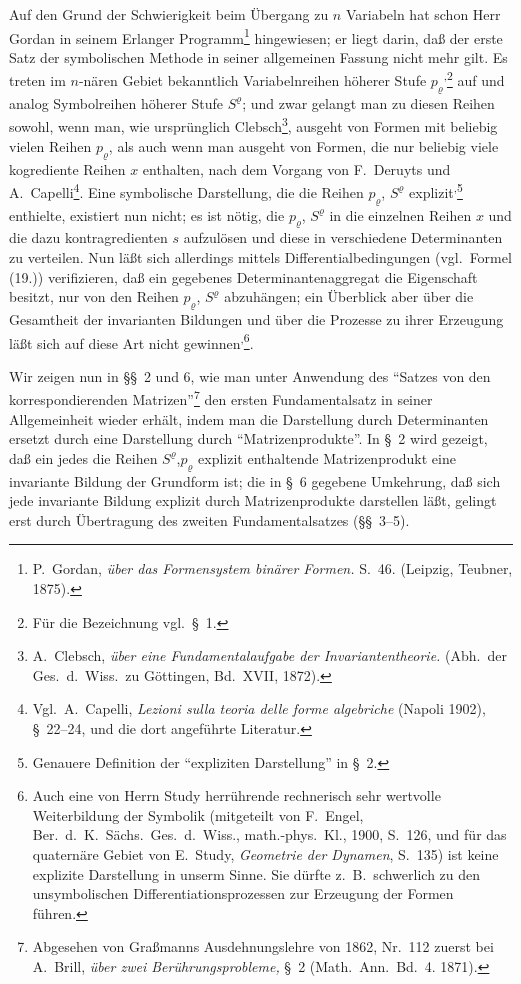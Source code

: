\documentclass[12pt,a4paper]{article}
\begin{document}
Auf den Grund der Schwierigkeit beim Übergang zu $n$ Variabeln hat schon Herr Gordan in seinem Erlanger Programm\footnote{P.\ Gordan, \textit{über das Formensystem binärer Formen.} S.~46. (Leipzig, Teubner, 1875).} hingewiesen; er liegt darin, daß der erste Satz der symbolischen Methode in seiner allgemeinen Fassung nicht mehr gilt. Es treten im $n$-nären Gebiet bekanntlich Variabelnreihen höherer Stufe $p_{\varrho}$\textsuperscript{,}\footnote{Für die Bezeichnung vgl.\ \S\ 1.} auf und analog Symbolreihen höherer Stufe $S^{\varrho}$; und zwar gelangt man zu diesen Reihen sowohl, wenn man, wie ursprünglich Clebsch\footnote{A.\ Clebsch, \textit{über eine Fundamentalaufgabe der Invariantentheorie.} (Abh.\ der Ges.\ d.\ Wiss.\ zu Göttingen, Bd.~XVII, 1872).}, ausgeht von Formen mit beliebig vielen Reihen $p_{\varrho}$, als auch wenn man ausgeht von Formen, die nur beliebig viele kogrediente Reihen $x$ enthalten, nach dem Vorgang von F.\ Deruyts und A.\ Capelli\footnote{Vgl.\ A.\ Capelli, \textit{Lezioni sulla teoria delle forme algebriche} (Napoli 1902), \S\ 22--24, und die dort angeführte Literatur.}. Eine symbolische Darstellung, die die Reihen $p_{\varrho}$, $S^{\varrho}$ explizit\textsuperscript{,}\footnote{Genauere Definition der ``expliziten Darstellung'' in \S\ 2.} enthielte, existiert nun nicht; es ist nötig, die $p_{\varrho}$, $S^{\varrho}$ in die einzelnen Reihen $x$ und die dazu kontragredienten $s$ aufzulösen und diese in verschiedene Determinanten zu verteilen. Nun läßt sich allerdings mittels Differentialbedingungen (vgl.\ Formel (19.)) verifizieren, daß ein gegebenes Determinantenaggregat die Eigenschaft besitzt, nur von den Reihen $p_{\varrho}$, $S^{\varrho}$ abzuhängen; ein Überblick aber über die Gesamtheit der invarianten Bildungen und über die Prozesse zu ihrer Erzeugung läßt sich auf diese Art nicht gewinnen\textsuperscript{,}\footnote{Auch eine von Herrn Study herrührende rechnerisch sehr wertvolle Weiterbildung der Symbolik (mitgeteilt von F.\ Engel, Ber.\ d.\ K.\ Sächs.\ Ges.\ d.\ Wiss., math.-phys.\ Kl., 1900, S.~126, und für das quaternäre Gebiet von E.\ Study, \textit{Geometrie der Dynamen}, S.~135) ist keine explizite Darstellung in unserm Sinne. Sie dürfte z.~B.\ schwerlich zu den unsymbolischen Differentiationsprozessen zur Erzeugung der Formen führen.}.

Wir zeigen nun in \S\S\ 2 und 6, wie man unter Anwendung des ``Satzes von den korrespondierenden Matrizen''\footnote{Abgesehen von Graßmanns Ausdehnungslehre von 1862, Nr.~112 zuerst bei A.\ Brill, \textit{über zwei Berührungsprobleme,} \S\ 2 (Math.\ Ann.\ Bd.~4. 1871).} den ersten Fundamentalsatz in seiner Allgemeinheit wieder erhält, indem man die Darstellung durch Determinanten ersetzt durch eine Darstellung durch ``Matrizenprodukte''. In \S\ 2 wird gezeigt, daß ein jedes die Reihen $S^{\varrho}$,$p_{\varrho}$ explizit enthaltende Matrizenprodukt eine invariante Bildung der Grundform ist; die in \S\ 6 gegebene Umkehrung, daß sich jede invariante Bildung explizit durch Matrizenprodukte darstellen läßt, gelingt erst durch Übertragung des zweiten Fundamentalsatzes (\S\S\ 3--5).
\end{document}
